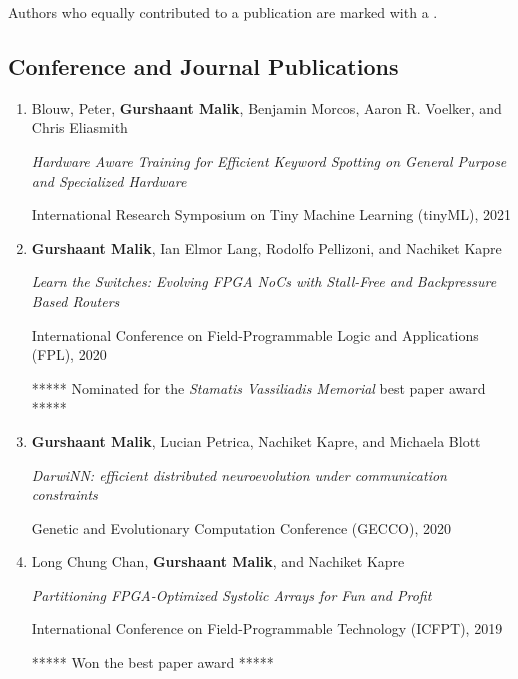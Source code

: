 Authors who equally contributed to a publication are marked with a \textdagger.


\subsection{Conference and Journal Publications}

\begin{enumerate}
    \item Blouw, Peter, \textbf{Gurshaant Malik}, Benjamin Morcos, Aaron R. Voelker, and Chris Eliasmith
    
    \textit{Hardware Aware Training for Efficient Keyword Spotting on General Purpose and Specialized Hardware}
    
    International Research Symposium on Tiny Machine Learning (tinyML), 2021
    
    \item \textbf{Gurshaant Malik}, Ian Elmor Lang, Rodolfo Pellizoni, and Nachiket Kapre
    
    \textit{Learn the Switches: Evolving FPGA NoCs with Stall-Free and Backpressure Based Routers}
    
    International Conference on Field-Programmable Logic and Applications (FPL), 2020
    
    ***** Nominated for the \textit{Stamatis Vassiliadis Memorial} best paper award *****
    
    \item \textbf{Gurshaant Malik}\ec, Lucian Petrica\ec, Nachiket Kapre, and Michaela Blott
    
    \textit{DarwiNN: efficient distributed neuroevolution under communication constraints}
    
    Genetic and Evolutionary Computation Conference (GECCO), 2020
    
	\item Long Chung Chan, \textbf{Gurshaant Malik}, and Nachiket Kapre
	
	\textit{Partitioning FPGA-Optimized Systolic Arrays for Fun and Profit}
	
	International Conference on Field-Programmable Technology (ICFPT), 2019
	
	***** Won the best paper award *****
	

\end{enumerate}
